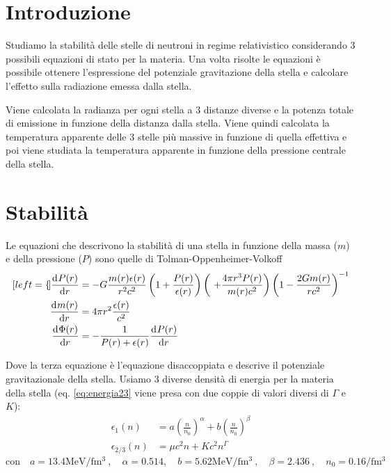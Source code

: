\documentclass[a4paper, titlepage]{article}
\begin{document}
\tableofcontents
\newpage

\section{Introduzione}
Studiamo la stabilità delle stelle di neutroni in regime relativistico considerando 3 possibili equazioni di stato per la materia.
Una volta risolte le equazioni è possibile ottenere l'espressione del potenziale gravitazione della stella e calcolare l'effetto sulla radiazione emessa dalla stella.


Viene calcolata la radianza per ogni stella a 3 distanze diverse e la potenza totale di emissione in funzione della distanza dalla stella.
Viene quindi calcolata la temperatura apparente delle 3 stelle più massive in funzione di quella effettiva e poi viene studiata la temperatura apparente in funzione della pressione centrale della stella.

\section{Stabilità}

Le equazioni che descrivono la stabilità di una stella in funzione della massa ($m$) e della pressione ($P$) sono quelle di Tolman-Oppenheimer-Volkoff
\begin{subequations}
    \begin{align}[left = {\empheqlbrace}]
        \dv[]{P(r)}{r} &= - G \frac{m(r) \epsilon (r)}{r^2 c^2} \left(1 + \frac{P(r)}{\epsilon (r)} \right) \left(\ + \frac{4 \pi r^3 P(r)}{m(r) c^2} \right) \left(1 - \frac{2 G m(r)}{r c^2} \right)^{-1} \label{eq:P_corr} \\
        \dv[]{m(r)}{r} &= 4 \pi r^2 \frac{\epsilon (r)}{c^2} \label{eq:m_corr} \\
        \dv[]{\Phi(r)}{r} &= - \frac{1}{P(r) + \epsilon (r)} \dv[]{P(r)}{r} \label{eq:Phi_corr}
    \end{align}
    \label{eq:sistema_corr}
\end{subequations}

Dove la terza equazione è l'equazione disaccoppiata e descrive il potenziale gravitazionale della stella.
Usiamo 3 diverse densità di energia per la materia della stella (eq. \ref{eq:energia23} viene presa con due coppie di valori diversi di $\Gamma$ e $K$):
\begin{subequations}
\begin{align}
    \epsilon_1 (n) &= a \left( \frac{n}{n_0} \right) ^{\alpha} + b \left( \frac{n}{n_0} \right) ^{\beta} \label{eq:energia1} \\
    \epsilon_{2/3} (n) &= \mu c^2n+Kc^2n^\Gamma \label{eq:energia23}
\end{align}
\end{subequations}
\begin{equation}
    \text{con} \quad a = 13.4 \unit{\mega\electronvolt\per\femto\cubic\meter} \ , \quad
    \alpha = 0.514, \quad
    b = 5.62 \unit{\mega\electronvolt\per\femto\cubic\meter} \ , \quad
    \beta = 2.436 \ , \quad
    n_0 = 0.16 \unit{\per\femto\cubic\meter}
\end{equation}
\end{document}
